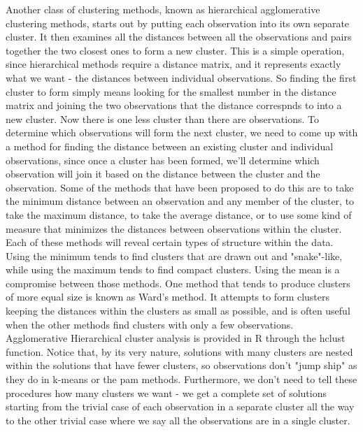 Another class of clustering methods, known as hierarchical agglomerative clustering methods, starts out by putting each observation into its own separate cluster. It then examines all the distances between all the observations and pairs together the two closest ones to form a new cluster. This is a simple operation, since hierarchical methods require a distance matrix, and it represents exactly what we want - the distances between individual observations. So finding the first cluster to form simply means looking for the smallest number in the distance matrix and joining the two observations that the distance correspnds to into a new cluster. Now there is one less cluster than there are observations. To determine which observations will form the next cluster, we need to come up with a method for finding the distance between an existing cluster and individual observations, since once a cluster has been formed, we'll determine which observation will join it based on the distance between the cluster and the observation. Some of the methods that have been proposed to do this are to take the minimum distance between an observation and any member of the cluster, to take the maximum distance, to take the average distance, or to use some kind of measure that minimizes the distances between observations within the cluster. Each of these methods will reveal certain types of structure within the data. Using the minimum tends to find clusters that are drawn out and "snake"-like, while using the maximum tends to find compact clusters. Using the mean is a compromise between those methods. One method that tends to produce clusters of more equal size is known as Ward's method. It attempts to form clusters keeping the distances within the clusters as small as possible, and is often useful when the other methods find clusters with only a few observations. Agglomerative Hierarchical cluster analysis is provided in R through the hclust function.
Notice that, by its very nature, solutions with many clusters are nested within the solutions that have fewer clusters, so observations don't "jump ship" as they do in k-means or the pam methods. Furthermore, we don't need to tell these procedures how many clusters we want - we get a complete set of solutions starting from the trivial case of each observation in a separate cluster all the way to the other trivial case where we say all the observations are in a single cluster.
